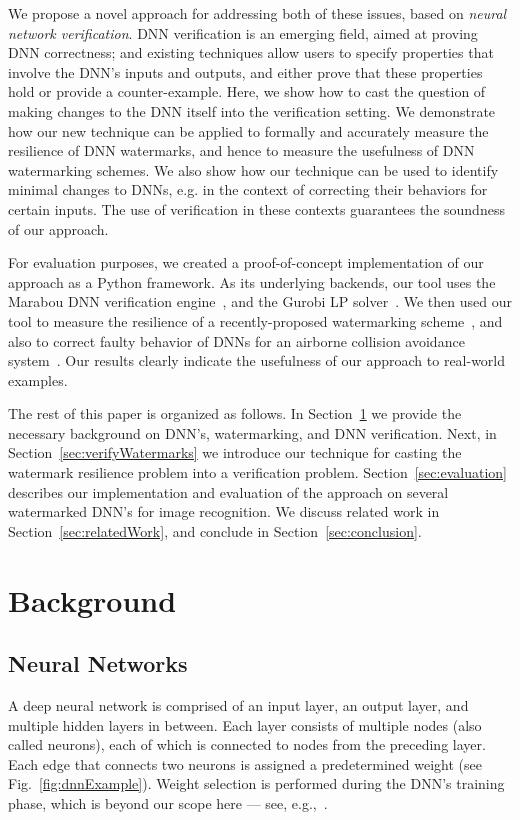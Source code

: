 \documentclass{easychair}
\begin{document}
We propose a novel approach for addressing both of these issues, based
on \emph{neural network verification}. DNN verification is an emerging
field, aimed at proving DNN correctness; and existing techniques allow
users to specify properties that involve the DNN's inputs and outputs,
and either prove that these properties hold or provide a
counter-example. Here, we show how to cast the question of making
changes to the DNN itself into the verification setting. We
demonstrate how our new technique can be applied to formally and
accurately measure the resilience of DNN watermarks, and hence to
measure the usefulness of DNN watermarking schemes. We also show how
our technique can be used to identify minimal changes to DNNs, e.g. in
the context of correcting their behaviors for certain inputs. The use
of verification in these contexts guarantees the soundness of our
approach.

For evaluation purposes, we created a proof-of-concept implementation
of our approach as a Python framework. As its underlying backends, our
tool uses the Marabou DNN verification
engine~\cite{KaHuIbJuLaLiShThWuZeDiKoBa19Marabou}, and the Gurobi LP
solver~\cite{gurobi}. We then used our tool to measure the resilience
of a recently-proposed watermarking
scheme~\cite{AdBaPiKeWatermarking}, and also to correct faulty
behavior of DNNs for an airborne collision avoidance
system~\cite{JuLoBrOwKo16,KaBaDiJuKo17Reluplex}. Our results clearly
indicate the usefulness of our approach to real-world examples.

The rest of this paper is organized as follows. In
Section~\ref{sec:background} we provide the necessary background on
DNN's, watermarking, and DNN verification. Next, in
Section~\ref{sec:verifyWatermarks} we introduce our technique for
casting the watermark resilience problem into a verification
problem. Section~\ref{sec:evaluation} describes our implementation and
evaluation of the approach on several watermarked DNN's for image
recognition. We discuss related work in Section~\ref{sec:relatedWork},
and conclude in Section~\ref{sec:conclusion}.

\section{Background}
\label{sec:background}

\subsection{Neural Networks}
A deep neural network is comprised of an input layer, an output layer,
and multiple hidden layers in between. Each layer consists of multiple
nodes (also called neurons), each of which is connected to nodes from
the preceding layer. Each edge that connects two neurons is assigned a
predetermined weight (see Fig.~\ref{fig:dnnExample}). Weight selection
is performed during the DNN's training phase, which is beyond our
scope here --- see, e.g.,~\cite{FoBeCu16}. 
\end{document}
